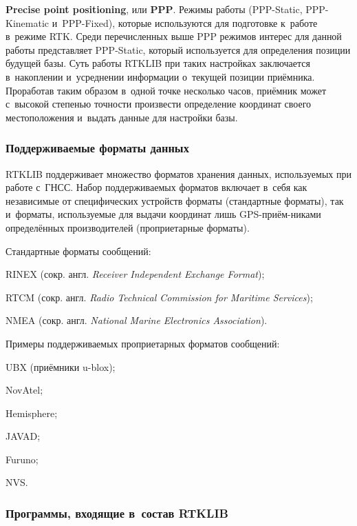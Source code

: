 \begin{dashitemize}
  \item \textbf{Precise point positioning}, или \textbf{PPP}. Режимы работы (PPP-Static, PPP-Kinematic и~PPP-Fixed), которые используются для подготовке к~работе в~режиме RTK.
  Среди перечисленных выше PPP режимов интерес для данной работы представляет PPP-Static, который используется для определения позиции будущей базы. Суть работы RTKLIB при таких настройках заключается в~накоплении и~усреднении информации о~текущей позиции приёмника. Проработав таким образом в~одной точке несколько часов, приёмник может с~высокой степенью точности произвести определение координат своего местоположения и~выдать данные для настройки базы.
\end{dashitemize}

\subsubsection{Поддерживаемые форматы данных}
\label{subsec:rtklib-data-formats}

RTKLIB поддерживает множество форматов хранения данных, используемых при работе с~ГНСС. Набор поддерживаемых форматов включает в~себя как независимые от специфических устройств форматы (стандартные форматы), так и~форматы, используемые для выдачи координат лишь GPS-приём-никами определённых производителей (проприетарные форматы).

Стандартные форматы сообщений:
\begin{dashitemize}
  \item RINEX (сокр. англ. \emph{Receiver Independent Exchange Format});
  \item RTCM (сокр. англ. \emph{Radio Technical Commission for Maritime Services});
  \item NMEA (сокр. англ. \emph{National Marine Electronics Association}).
\end{dashitemize}

Примеры поддерживаемых проприетарных форматов сообщений:
\begin{dashitemize}
  \item UBX (приёмники u-blox);
  \item NovAtel;
  \item Hemisphere;
  \item JAVAD;
  \item Furuno;
  \item NVS.
\end{dashitemize}

\subsubsection{Программы, входящие в~состав RTKLIB}
\label{subsec:rtklib-apps}


